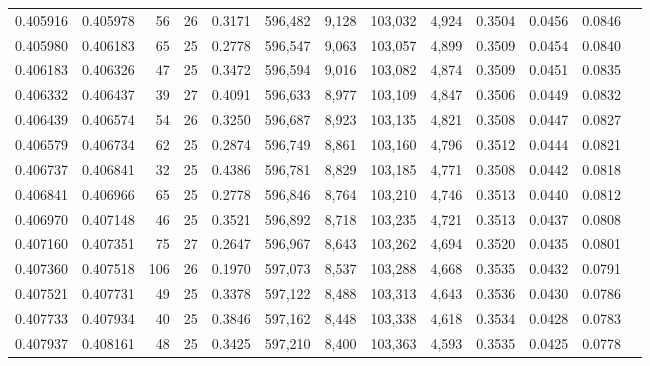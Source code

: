 \begin{tabular}{rrrrrrrrrrrrr}
0.405916 & 0.405978 &    56 &  26 &                                     0.3171 & 596,482 &   9,128 & 103,032 &   4,924 & 0.3504 & 0.0456 & 0.0846 \\
0.405980 & 0.406183 &    65 &  25 &                                     0.2778 & 596,547 &   9,063 & 103,057 &   4,899 & 0.3509 & 0.0454 & 0.0840 \\
0.406183 & 0.406326 &    47 &  25 &                                     0.3472 & 596,594 &   9,016 & 103,082 &   4,874 & 0.3509 & 0.0451 & 0.0835 \\
0.406332 & 0.406437 &    39 &  27 &                                     0.4091 & 596,633 &   8,977 & 103,109 &   4,847 & 0.3506 & 0.0449 & 0.0832 \\
0.406439 & 0.406574 &    54 &  26 &                                     0.3250 & 596,687 &   8,923 & 103,135 &   4,821 & 0.3508 & 0.0447 & 0.0827 \\
0.406579 & 0.406734 &    62 &  25 &                                     0.2874 & 596,749 &   8,861 & 103,160 &   4,796 & 0.3512 & 0.0444 & 0.0821 \\
0.406737 & 0.406841 &    32 &  25 &                                     0.4386 & 596,781 &   8,829 & 103,185 &   4,771 & 0.3508 & 0.0442 & 0.0818 \\
0.406841 & 0.406966 &    65 &  25 &                                     0.2778 & 596,846 &   8,764 & 103,210 &   4,746 & 0.3513 & 0.0440 & 0.0812 \\
0.406970 & 0.407148 &    46 &  25 &                                     0.3521 & 596,892 &   8,718 & 103,235 &   4,721 & 0.3513 & 0.0437 & 0.0808 \\
0.407160 & 0.407351 &    75 &  27 &                                     0.2647 & 596,967 &   8,643 & 103,262 &   4,694 & 0.3520 & 0.0435 & 0.0801 \\
0.407360 & 0.407518 &   106 &  26 &                                     0.1970 & 597,073 &   8,537 & 103,288 &   4,668 & 0.3535 & 0.0432 & 0.0791 \\
0.407521 & 0.407731 &    49 &  25 &                                     0.3378 & 597,122 &   8,488 & 103,313 &   4,643 & 0.3536 & 0.0430 & 0.0786 \\
0.407733 & 0.407934 &    40 &  25 &                                     0.3846 & 597,162 &   8,448 & 103,338 &   4,618 & 0.3534 & 0.0428 & 0.0783 \\
0.407937 & 0.408161 &    48 &  25 &                                     0.3425 & 597,210 &   8,400 & 103,363 &   4,593 & 0.3535 & 0.0425 & 0.0778 \\

\end{tabular}
